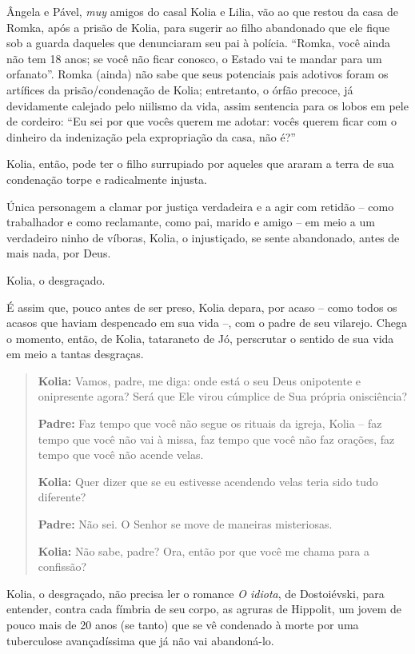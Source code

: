 Ângela e Pável, \emph{muy} amigos do casal Kolia e Lilia, vão ao que
restou da casa de Romka, após a prisão de Kolia, para sugerir ao filho
abandonado que ele fique sob a guarda daqueles que denunciaram seu pai à
polícia. ``Romka, você ainda não tem 18 anos; se você não ficar conosco,
o Estado vai te mandar para um orfanato''. Romka (ainda) não sabe que
seus potenciais pais adotivos foram os artífices da prisão/condenação de
Kolia; entretanto, o órfão precoce, já devidamente calejado pelo
niilismo da vida, assim sentencia para os lobos em pele de cordeiro:
``Eu sei por que vocês querem me adotar: vocês querem ficar com o
dinheiro da indenização pela expropriação da casa, não é?''

Kolia, então, pode ter o filho surrupiado por aqueles que araram a terra
de sua condenação torpe e radicalmente injusta.

Única personagem a clamar por justiça verdadeira e a agir com retidão --
como trabalhador e como reclamante, como pai, marido e amigo -- em meio
a um verdadeiro ninho de víboras, Kolia, o injustiçado, se sente
abandonado, antes de mais nada, por Deus.

Kolia, o desgraçado.

É assim que, pouco antes de ser preso, Kolia depara, por acaso -- como
todos os acasos que haviam despencado em sua vida --, com o padre de seu
vilarejo. Chega o momento, então, de Kolia, tataraneto de Jó, perscrutar
o sentido de sua vida em meio a tantas desgraças.

\begin{quote}
\textbf{Kolia:} Vamos, padre, me diga: onde está o seu Deus onipotente e
onipresente agora? Será que Ele virou cúmplice de Sua própria
onisciência?

\textbf{Padre:} Faz tempo que você não segue os rituais da igreja, Kolia
-- faz tempo que você não vai à missa, faz tempo que você não faz
orações, faz tempo que você não acende velas.

\textbf{Kolia:} Quer dizer que se eu estivesse acendendo velas teria
sido tudo diferente?

\textbf{Padre:} Não sei. O Senhor se move de maneiras misteriosas.

\textbf{Kolia:} Não sabe, padre? Ora, então por que você me chama para a
confissão?
\end{quote}

Kolia, o desgraçado, não precisa ler o romance \emph{O idiota}, de
Dostoiévski, para entender, contra cada fímbria de seu corpo, as agruras
de Hippolit, um jovem de pouco mais de 20 anos (se tanto) que se vê
condenado à morte por uma tuberculose avançadíssima que já não vai
abandoná-lo.

